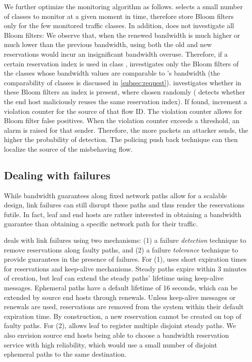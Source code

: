We further optimize the monitoring algorithm as follows. \name selects a small
number of classes to monitor at a given moment in time, therefore \ADs store
Bloom filters only for the few monitored traffic classes. In addition, \name
does not investigate all Bloom filters: We observe that, when the renewed
bandwidth is much higher or much lower than the previous bandwidth, using both
the old and new reservations would incur an insignificant bandwidth overuse.
Therefore, if a certain reservation index is used in class , \name
investigates only the Bloom filters of the classes whose bandwidth values are
comparable to 's bandwidth (the comparability of classes is discussed in
\autoref{subsec:request}).  \name investigates whether in these Bloom filters
an index  is present, where  chosen randomly ( detects whether the end host maliciously reuses
the same reservation index).  If found, \ADs increment a violation counter for
the source of that flow ID.  The violation counter allows for Bloom filter
false positives. When the violation counter exceeds a threshold, an alarm is
raised for that sender.  Therefore, the more packets an attacker sends, the
higher the probability of detection.  The policing push back technique can then
localize the source \AD of the misbehaving flow. 

\subsection{Dealing with failures}

\noindent
While bandwidth guarantees along fixed network paths allow for a
scalable design, link failures can still disrupt these paths and thus render
the reservations futile. In fact, leaf \ADs and end hosts are rather
interested in obtaining a bandwidth guarantee than
obtaining a specific network path for their traffic.

\name deals with link failures using two mechanisms: (1)
a failure \emph{detection} technique to remove reservations along
faulty paths, and (2) a failure \emph{tolerance} technique to provide
guarantees in the presence of failures. For (1), \name uses short
expiration times for reservations and keep-alive mechanisms. Steady
paths expire within 3 minutes of creation, but leaf \ADs can extend
the steady paths' lifetime using keep-alive messages. Ephemeral paths
have a default lifetime of 16 seconds, which can be extended by
source end hosts through renewals. Unless keep-alive messages or
renewals are used, reservations are removed from the system within
their default expiration time. By construction, a new reservation
cannot be created on top of faulty paths. For (2), \name allows
leaf \ADs to register multiple disjoint steady paths. We also
envision source end hosts being able to choose a bandwidth
reservation service with high reliability, which would use a
small number of disjoint ephemeral paths to the same destination.


